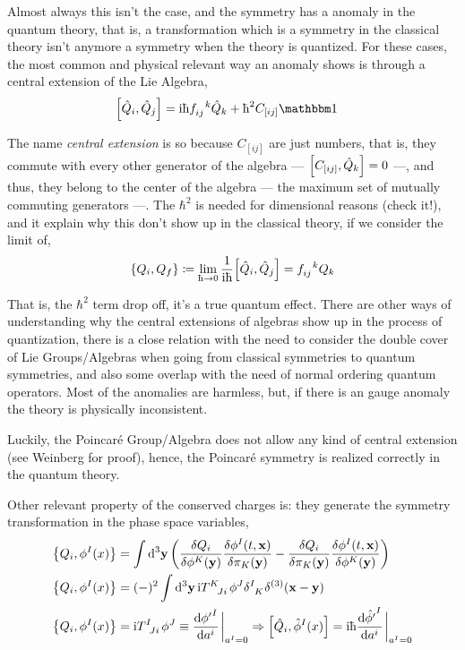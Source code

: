 Almost always this isn't the case, and the symmetry has a anomaly in the quantum theory, that is, a transformation which is a symmetry in the classical 
theory isn't anymore a symmetry when the theory is quantized. For these cases, the most common and physical relevant way an anomaly shows is 
through a central extension of the Lie Algebra,
\begin{align}
    \comm{\hat Q_i}{\hat Q_j}&=\im\hbar \tensor{f}{_i_j^k}\hat Q_k+\hbar^2 C_{[ij]}\mathbbm 1
\end{align}

The name \textit{central extension} is so because $C_{[ij]}$ are just numbers, that is, they commute with every other generator of the algebra --- $\comm{C_{[ij]}}{\hat Q_k}=0$ ---, and thus, 
they belong to the center of the algebra --- the maximum set of mutually commuting generators ---. The $\hbar^2$ is needed for dimensional reasons (check it!), and 
it explain why this don't show up in the classical theory, if we consider the limit of,
\begin{align}
    \acomm{Q_i}{Q_f}\coloneq \lim\limits_{\hbar\rightarrow 0}\frac{1}{\im\hbar}\comm{\hat Q_i}{\hat Q_j} = \tensor{f}{_i_j^k} Q_k
\end{align}

That is, the $\hbar^2$ term drop off, it's a true quantum effect. There are other ways of understanding why the central extensions of algebras show up 
in the process of quantization, there is a close relation with the need to consider the double cover of Lie Groups/Algebras when going from classical 
symmetries to quantum symmetries, and also some overlap with the need of normal ordering quantum operators. Most of the anomalies are harmless, but, if there is an gauge anomaly the theory is physically inconsistent.

Luckily, the Poincaré Group/Algebra does not allow any kind of central extension (see Weinberg for proof), hence, the Poincaré symmetry is realized 
correctly in the quantum theory.

Other relevant property of the conserved charges is: they generate the symmetry transformation in the phase space variables,
\begin{align}
    \acomm{Q_i}{\phi^I(x)}&= \int\dd[3]{\vb y}\qty(\fdv{Q_i}{\phi^K\qty(\vb y)}\fdv{\phi^I(t,\vb x)}{\pi_K\qty(\vb y)}-\fdv{Q_i}{\pi_K\qty(\vb y)}\fdv{\phi^I\qty(t,\vb x)}{\phi^K\qty(\vb y)})\\
    \acomm{Q_i}{\phi^I(x)}&= (-)^2\int\dd[3]{\vb y}\im\tensor{T}{^K_J_i}\phi^J\tensor{\delta}{^I_K}\delta^{(3)}\qty(\vb x-\vb y)\\
    \acomm{Q_i}{\phi^I(x)}&= \im\tensor{T}{^I_J_i}\phi^J\equiv \dv{{\phi'}^I}{a^i}\eval_{a^I=0}\Rightarrow \comm{{\hat Q_i}}{{\hat\phi}^I(x)}= \im\hbar\dv{{\hat{\phi'}}^I}{a^i}\eval_{a^I=0}
\end{align}

